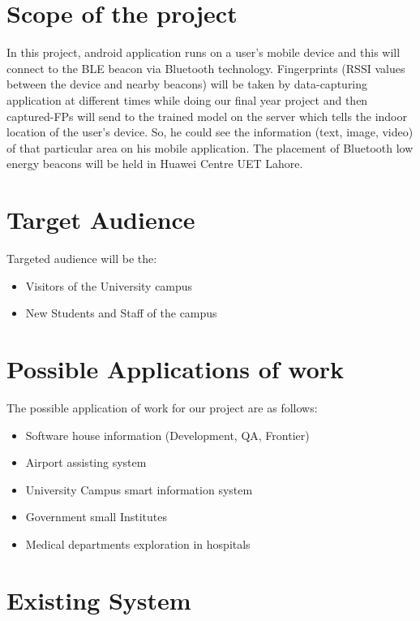 \documentclass{article}
\begin{document}
\section{Scope of the project}
In this project, android application runs on a user’s mobile device and this will connect to the BLE beacon via Bluetooth technology. Fingerprints (RSSI values between the device and nearby beacons) will be taken by data-capturing application at different times while doing our final year project and then captured-FPs will send to the trained model on the server which tells the indoor location of the user’s device.\cite{lLoco} So, he could see the information (text, image, video) of that particular area on his mobile application. The placement of Bluetooth low energy beacons will be held in Huawei Centre UET Lahore. 

\section{Target Audience}
Targeted audience will be the:
\begin{itemize}
\item Visitors of the University campus 
\item New Students and Staff of the campus
\end{itemize}



\section{Possible Applications of work}
The possible application of work for our project are as follows:


\begin{itemize}
\item Software house information (Development, QA, Frontier)
\item Airport assisting system
\item University Campus smart information system
\item Government small Institutes
\item Medical departments exploration in hospitals
\end{itemize}

\section{Existing System}
\end{document}
